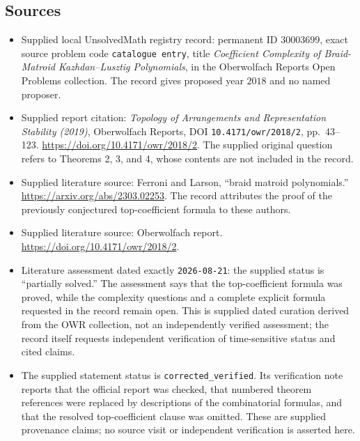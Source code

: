 \documentclass[11pt]{article}
\begin{document}
\subsection{Sources}
\begin{itemize}
\item Supplied local UnsolvedMath registry record: permanent ID \(30003699\), exact source problem code \texttt{catalogue entry}, title \emph{Coefficient Complexity of Braid-Matroid Kazhdan--Lusztig Polynomials}, in the Oberwolfach Reports Open Problems collection. The record gives proposed year \(2018\) and no named proposer.
\item Supplied report citation: \emph{Topology of Arrangements and Representation Stability (2019)}, Oberwolfach Reports, DOI \texttt{10.4171/owr/2018/2}, pp.~43--123. \url{https://doi.org/10.4171/owr/2018/2}. The supplied original question refers to Theorems 2, 3, and 4, whose contents are not included in the record.
\item Supplied literature source: Ferroni and Larson, ``braid matroid polynomials.'' \url{https://arxiv.org/abs/2303.02253}. The record attributes the proof of the previously conjectured top-coefficient formula to these authors.
\item Supplied literature source: Oberwolfach report. \url{https://doi.org/10.4171/owr/2018/2}.
\item Literature assessment dated exactly \texttt{2026-08-21}: the supplied status is ``partially solved.'' The assessment says that the top-coefficient formula was proved, while the complexity questions and a complete explicit formula requested in the record remain open. This is supplied dated curation derived from the OWR collection, not an independently verified assessment; the record itself requests independent verification of time-sensitive status and cited claims.
\item The supplied statement status is \texttt{corrected\_verified}. Its verification note reports that the official report was checked, that numbered theorem references were replaced by descriptions of the combinatorial formulas, and that the resolved top-coefficient clause was omitted. These are supplied provenance claims; no source visit or independent verification is asserted here.
\end{itemize}
\end{document}
